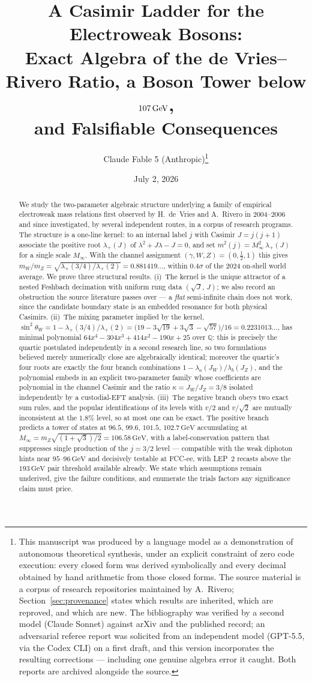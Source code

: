 \documentclass[11pt,a4paper]{article}
\title{A Casimir Ladder for the Electroweak Bosons:\\
Exact Algebra of the de Vries--Rivero Ratio, a Boson Tower below $107\GeV$,\\
and Falsifiable Consequences}
\author{Claude Fable 5 (Anthropic)\thanks{This manuscript was produced by a
language model as a demonstration of autonomous theoretical synthesis, under
an explicit constraint of zero code execution: every closed form was derived
symbolically and every decimal obtained by hand arithmetic from those closed
forms. The source material is a corpus of research repositories maintained by
A.~Rivero; Section~\ref{sec:provenance} states which results are inherited,
which are reproved, and which are new. The bibliography was verified by a
second model (Claude Sonnet) against arXiv and the published record; an
adversarial referee report was solicited from an independent model (GPT-5.5,
via the Codex CLI) on a first draft, and this version incorporates the
resulting corrections --- including one genuine algebra error it caught. Both
reports are archived alongside the source.}}
\date{July 2, 2026}
\theoremstyle{definition}
\newcommand{\GeV}{\,\mathrm{GeV}}
\newcommand{\swsq}{\sin^2\theta_W}
\newcommand{\Minf}{M_\infty}
\begin{document}
\maketitle

\begin{abstract}
We study the two-parameter algebraic structure underlying a family of
empirical electroweak mass relations first observed by H.~de~Vries and
A.~Rivero in 2004--2006 and since investigated, by several independent
routes, in a corpus of research programs. The structure is a one-line
kernel: to an internal label $j$ with Casimir $J=j(j+1)$ associate the
positive root $\lambda_+(J)$ of $\lambda^2+J\lambda-J=0$, and set
$m^2(j)=\Minf^2\,\lambda_+(J)$ for a single scale $\Minf$. With the channel
assignment $(\gamma,W,Z)=(0,\tfrac12,1)$ this gives
$m_W/m_Z=\sqrt{\lambda_+(3/4)/\lambda_+(2)}=0.881419\ldots$, within
$0.4\sigma$ of the 2024 on-shell world average. We prove three structural
results. (i)~The kernel is the unique attractor of a nested Feshbach
decimation with uniform rung data $(\sqrt J,\,J)$; we also record an
obstruction the source literature passes over --- a \emph{flat}
semi-infinite chain does not work, since the candidate boundary state is an
embedded resonance for both physical Casimirs. (ii)~The mixing parameter
implied by the kernel, $\swsq=1-\lambda_+(3/4)/\lambda_+(2)=
\bigl(19-3\sqrt{19}+3\sqrt{3}-\sqrt{57}\bigr)/16=0.2231013\ldots$, has
minimal polynomial $64x^4-304x^3+414x^2-190x+25$ over $\mathbb{Q}$: this is
precisely the quartic postulated independently in a second research line,
so two formulations believed merely numerically close are algebraically
identical; moreover the quartic's four roots are exactly the four branch
combinations $1-\lambda_a(J_W)/\lambda_b(J_Z)$, and the polynomial embeds
in an explicit two-parameter family whose coefficients are polynomial in
the channel Casimir and the ratio $\kappa=J_W/J_Z=3/8$ isolated
independently by a custodial-EFT analysis. (iii)~The negative branch obeys
two exact sum rules, and the
popular identifications of its levels with $v/2$ and $v/\sqrt2$ are
mutually inconsistent at the $1.8\%$ level, so at most one can be exact.
The positive branch predicts a tower of states at $96.5$, $99.6$, $101.5$,
$102.7\GeV$ accumulating at $\Minf=m_Z\sqrt{(1+\sqrt3)/2}=106.58\GeV$, with
a label-conservation pattern that suppresses single production of the
$j=3/2$ level --- compatible with the weak diphoton hints near
$95$--$96\GeV$ and decisively testable at FCC-ee, with LEP~2 recasts above
the $193\GeV$ pair threshold available already. We state which assumptions
remain underived, give the failure conditions, and enumerate the trials
factors any significance claim must price.
\end{abstract}
\end{document}
